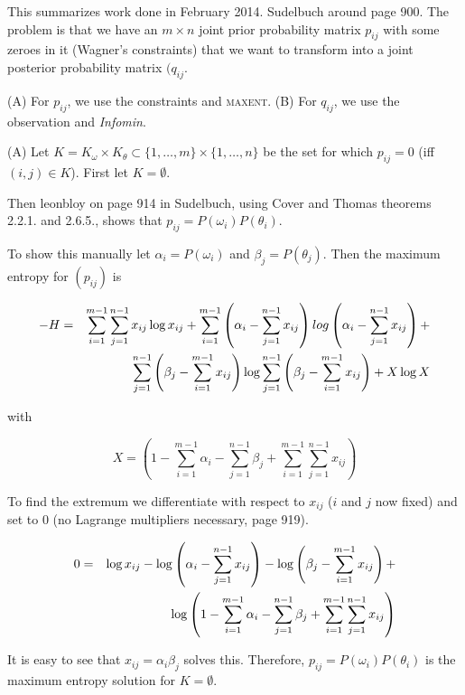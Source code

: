 \documentclass[11pt]{article}
\begin{document}
This summarizes work done in February 2014. Sudelbuch around page 900.
The problem is that we have an $m\times{}n$ joint prior probability
matrix $p_{ij}$ with some zeroes in it (Wagner's constraints) that we want to
transform into a joint posterior probability matrix $(q_{ij}$.

(A) For $p_{ij}$, we use the constraints and \textsc{maxent}. (B) For
$q_{ij}$, we use the observation and \emph{Infomin}.

(A) Let
$K=K_{\omega}\times{}K_{\theta}\subset\{1,\ldots,m\}\times\{1,\ldots,n\}$
be the set for which $p_{ij}=0$ (iff $(i,j)\in{}K$). First let
$K=\emptyset$.

Then leonbloy on page 914 in Sudelbuch, using Cover and Thomas
theorems 2.2.1. and 2.6.5., shows that
$p_{ij}=P(\omega_{i})P(\theta_{i})$.

To show this manually let $\alpha_{i}=P(\omega_{i})$ and
$\beta_{j}=P(\theta_{j})$. Then the maximum entropy for $(p_{ij})$ is

\begin{align}
\label{eq:e1}
  -H&=&\sum_{i=1}^{m-1}\sum_{j=1}^{n-1}x_{ij}\log{}x_{ij}+\sum_{i=1}^{m-1}\left(\alpha_{i}-\sum_{j=1}^{n-1}x_{ij}\right)log\left(\alpha_{i}-\sum_{j=1}^{n-1}x_{ij}\right)+ \notag \\
& & \sum_{j=1}^{n-1}\left(\beta_{j}-\sum_{i=1}^{m-1}x_{ij}\right)\log\sum_{j=1}^{n-1}\left(\beta_{j}-\sum_{i=1}^{m-1}x_{ij}\right)+X\log{}X 
\end{align}

with

\begin{equation}
X=\left(1-\sum_{i=1}^{m-1}\alpha_{i}-\sum_{j=1}^{n-1}\beta_{j}+\sum_{i=1}^{m-1}\sum_{j=1}^{n-1}x_{ij}\right)\label{eq:e2}
\end{equation}

To find the extremum we differentiate with respect to $x_{ij}$ ($i$
and $j$ now fixed) and set to $0$ (no Lagrange multipliers
necessary, page 919).

\begin{align}
  \label{eq:e3}
0&=&\log{}x_{ij}-\log\left(\alpha_{i}-\sum_{j=1}^{n-1}x_{ij}\right)-\log\left(\beta_{j}-\sum_{i=1}^{m-1}x_{ij}\right)+ \notag \\
& & \log\left(1-\sum_{i=1}^{m-1}\alpha_{i}-\sum_{j=1}^{n-1}\beta_{j}+\sum_{i=1}^{m-1}\sum_{j=1}^{n-1}x_{ij}\right)
\end{align}

It is easy to see that $x_{ij}=\alpha_{i}\beta_{j}$ solves this.
Therefore, $p_{ij}=P(\omega_{i})P(\theta_{i})$ is the maximum entropy
solution for $K=\emptyset$.
\end{document}
